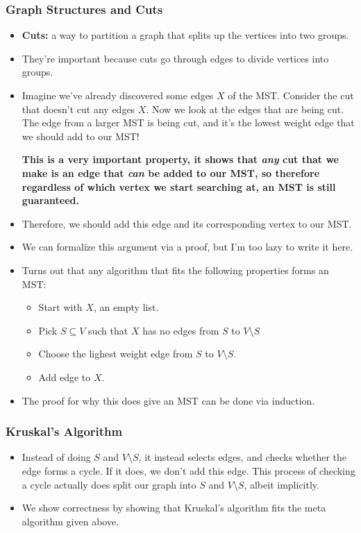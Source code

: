 	\subsubsection{Graph Structures and Cuts}
	\begin{itemize}
		\item \textbf{Cuts:} a way to partition a graph that splits up the vertices into two groups. 
		\item They're important because cuts go through edges to divide vertices into groups.  
		\item Imagine we've already discovered some edges $X$ of the MST. Consider the cut that doesn't cut 
			any edges $X$. Now we look at the edges that are being cut. The edge from a larger MST is being cut,
			and it's the lowest weight edge that we should add to our MST!

			\textbf{This is a very important property, it shows that \textit{any} cut that we make 
				is an edge that \textit{can} be added to our MST, so therefore regardless of which vertex
			we start searching at, an MST is still guaranteed.}
		\item Therefore, we should add this edge and its corresponding vertex to our MST.
		\item We can formalize this argument via a proof, but I'm too lazy to write it here.
		\item Turns out that any algorithm that fits the following properties forms an MST:
			\begin{itemize}
				\item Start with $X$, an empty list.  
				\item Pick $S \subseteq V$ such that $X$ has no edges from $S$ to $V \setminus S$
				\item Choose the lighest weight edge from $S$ to $V \setminus S$. 
				\item Add edge to $X$.
			\end{itemize}
		\item The proof for why this does give an MST can be done via induction.
	\end{itemize}
	\subsubsection{Kruskal's Algorithm}
	\begin{itemize}
		\item Instead of doing $S$ and $V \setminus S$, it instead selects edges, and checks whether 
			the edge forms a cycle. If it does, we don't add this edge. This process of checking a cycle 
			actually does split our graph into $S$ and $V \setminus S$, albeit implicitly. 
		\item We show correctness by showing that Kruskal's algorithm fits the meta algorithm given above. 
	\end{itemize}
